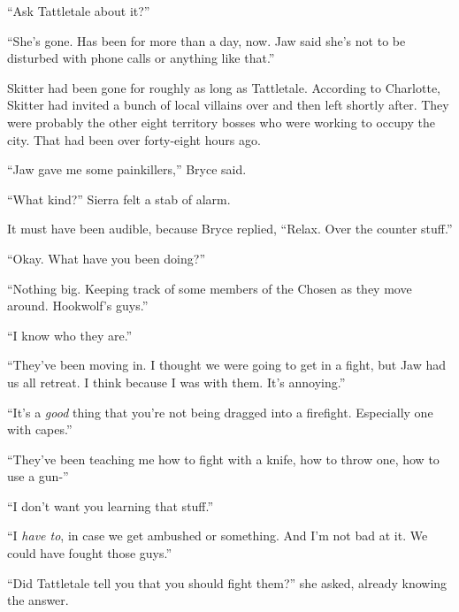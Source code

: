 ``Ask Tattletale about it?''



``She's gone.  Has been for more than a day, now.  Jaw said she's not to be disturbed with phone calls or anything like that.''



Skitter had been gone for roughly as long as Tattletale.  According to Charlotte, Skitter had invited a bunch of local villains over and then left shortly after.  They were probably the other eight territory bosses who were working to occupy the city.  That had been over forty-eight hours ago.



``Jaw gave me some painkillers,'' Bryce said.



``What kind?''  Sierra felt a stab of alarm.



It must have been audible, because Bryce replied, ``Relax.  Over the counter stuff.''



``Okay.  What have you been doing?''



``Nothing big.  Keeping track of some members of the Chosen as they move around.  Hookwolf's guys.''



``I know who they are.''



``They've been moving in.  I thought we were going to get in a fight, but Jaw had us all retreat.  I think because I was with them.  It's annoying.''



``It's a \emph{good} thing that you're not being dragged into a firefight.  Especially one with capes.''



``They've been teaching me how to fight with a knife, how to throw one, how to use a gun-''



``I don't want you learning that stuff.''



``I \emph{have to}, in case we get ambushed or something.  And I'm not bad at it.  We could have fought those guys.''



``Did Tattletale tell you that you should fight them?'' she asked, already knowing the answer.



